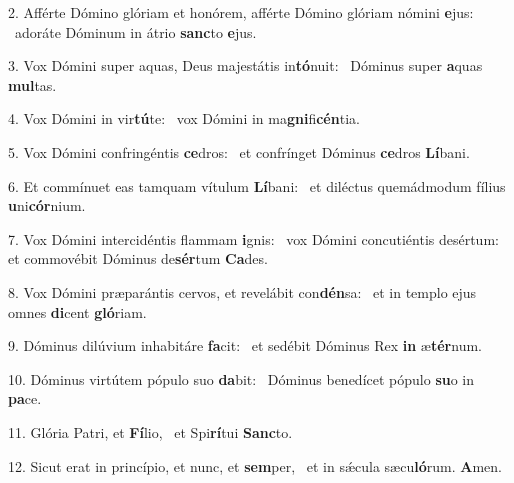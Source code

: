2. Afférte Dómino glóriam et honórem, afférte Dómino glóriam nómini \textbf{e}jus: \ast\  adoráte Dóminum in átrio \textbf{sanc}to \textbf{e}jus.\

3. Vox Dómini super aquas, Deus majestátis in\textbf{tó}nuit: \ast\  Dóminus super \textbf{a}quas \textbf{mul}tas.\

4. Vox Dómini in vir\textbf{tú}te: \ast\  vox Dómini in ma\textbf{gni}fi\textbf{cén}tia.\

5. Vox Dómini confringéntis \textbf{ce}dros: \ast\  et confrínget Dóminus \textbf{ce}dros \textbf{Lí}bani.\

6. Et commínuet eas tamquam vítulum \textbf{Lí}bani: \ast\  et diléctus quemádmodum fílius \textbf{u}ni\textbf{cór}nium.\

7. Vox Dómini intercidéntis flammam \textbf{i}gnis: \ast\  vox Dómini concutiéntis desértum: et commovébit Dóminus de\textbf{sér}tum \textbf{Ca}des.\

8. Vox Dómini præparántis cervos, et revelábit con\textbf{dén}sa: \ast\  et in templo ejus omnes \textbf{di}cent \textbf{gló}riam.\

9. Dóminus dilúvium inhabitáre \textbf{fa}cit: \ast\  et sedébit Dóminus Rex \textbf{in} æ\textbf{tér}num.\

10. Dóminus virtútem pópulo suo \textbf{da}bit: \ast\  Dóminus benedícet pópulo \textbf{su}o in \textbf{pa}ce.\

11. Glória Patri, et \textbf{Fí}lio, \ast\  et Spi\textbf{rí}tui \textbf{Sanc}to.\

12. Sicut erat in princípio, et nunc, et \textbf{sem}per, \ast\  et in sǽcula sæcu\textbf{ló}rum. \textbf{A}men.\

